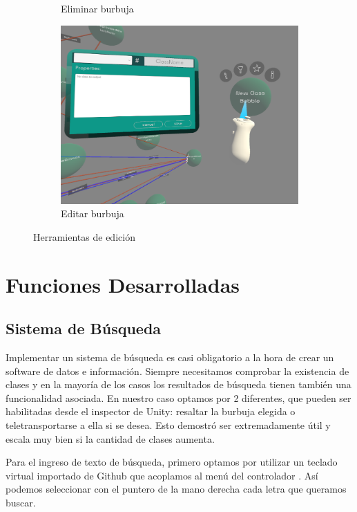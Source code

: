 \begin{figure}[ht]
\begin{subfigure}{0.3\textwidth}
       \caption{Eliminar burbuja}
   \end{subfigure}
   \hfill
   \begin{subfigure}{0.3\textwidth}
       \centering
       \includegraphics[width=\textwidth]{chapter2/figures/editbubble.png}
       \caption{Editar burbuja}
   \end{subfigure}
  \caption{Herramientas de edición}
\end{figure}

\section{Funciones Desarrolladas}

\subsection{Sistema de Búsqueda}

Implementar un sistema de búsqueda es casi obligatorio a la hora de crear un software de datos e información. Siempre necesitamos comprobar la existencia de clases y en la mayoría de los casos los resultados de búsqueda tienen también una funcionalidad asociada. En nuestro caso optamos por 2 diferentes, que pueden ser habilitadas desde el inspector de Unity: resaltar la burbuja elegida o teletransportarse a ella si se desea. Esto demostró ser extremadamente útil y escala muy bien si la cantidad de clases aumenta.

Para el ingreso de texto de búsqueda, primero optamos por utilizar un teclado virtual importado de Github que acoplamos al menú del controlador \cite[]{Keyboard}. Así podemos seleccionar con el puntero de la mano derecha cada letra que queramos buscar. 

